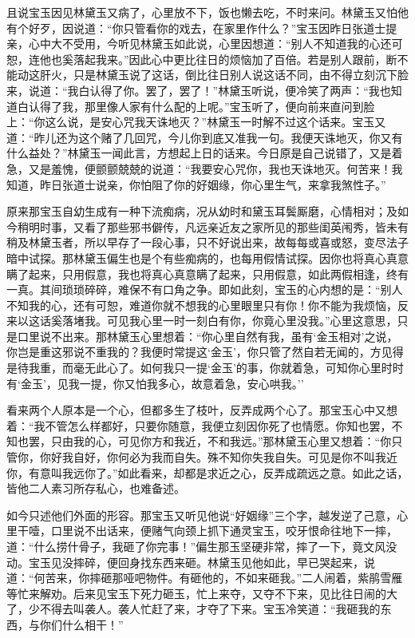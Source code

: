且说宝玉因见林黛玉又病了，心里放不下，饭也懒去吃，不时来问。林黛玉又怕他有个好歹，因说道：``你只管看你的戏去，在家里作什么？''宝玉因昨日张道士提亲，心中大不受用，今听见林黛玉如此说，心里因想道：``别人不知道我的心还可恕，连他也奚落起我来。''因此心中更比往日的烦恼加了百倍。若是别人跟前，断不能动这肝火，只是林黛玉说了这话，倒比往日别人说这话不同，由不得立刻沉下脸来，说道：``我白认得了你。罢了，罢了！''林黛玉听说，便冷笑了两声：``我也知道白认得了我，那里像人家有什么配的上呢。''宝玉听了，便向前来直问到脸上：``你这么说，是安心咒我天诛地灭？''林黛玉一时解不过这个话来。宝玉又道：``昨儿还为这个赌了几回咒，今儿你到底又准我一句。我便天诛地灭，你又有什么益处？''林黛玉一闻此言，方想起上日的话来。今日原是自己说错了，又是着急，又是羞愧，便颤颤兢兢的说道：``我要安心咒你，我也天诛地灭。何苦来！我知道，昨日张道士说亲，你怕阻了你的好姻缘，你心里生气，来拿我煞性子。''

原来那宝玉自幼生成有一种下流痴病，况从幼时和黛玉耳鬓厮磨，心情相对；及如今稍明时事，又看了那些邪书僻传，凡远亲近友之家所见的那些闺英闱秀，皆未有稍及林黛玉者，所以早存了一段心事，只不好说出来，故每每或喜或怒，变尽法子暗中试探。那林黛玉偏生也是个有些痴病的，也每用假情试探。因你也将真心真意瞒了起来，只用假意，我也将真心真意瞒了起来，只用假意，如此两假相逢，终有一真。其间琐琐碎碎，难保不有口角之争。即如此刻，宝玉的心内想的是：``别人不知我的心，还有可恕，难道你就不想我的心里眼里只有你！你不能为我烦恼，反来以这话奚落堵我。可见我心里一时一刻白有你，你竟心里没我。''心里这意思，只是口里说不出来。那林黛玉心里想着：``你心里自然有我，虽有`金玉相对'之说，你岂是重这邪说不重我的？我便时常提这`金玉'，你只管了然自若无闻的，方见得是待我重，而毫无此心了。如何我只一提`金玉'的事，你就着急，可知你心里时时有`金玉'，见我一提，你又怕我多心，故意着急，安心哄我。''

看来两个人原本是一个心，但都多生了枝叶，反弄成两个心了。那宝玉心中又想着：``我不管怎么样都好，只要你随意，我便立刻因你死了也情愿。你知也罢，不知也罢，只由我的心，可见你方和我近，不和我远。''那林黛玉心里又想着：``你只管你，你好我自好，你何必为我而自失。殊不知你失我自失。可见是你不叫我近你，有意叫我远你了。''如此看来，却都是求近之心，反弄成疏远之意。如此之话，皆他二人素习所存私心，也难备述。

如今只述他们外面的形容。那宝玉又听见他说``好姻缘''三个字，越发逆了己意，心里干噎，口里说不出话来，便赌气向颈上抓下通灵宝玉，咬牙恨命往地下一摔，道：``什么捞什骨子，我砸了你完事！''偏生那玉坚硬非常，摔了一下，竟文风没动。宝玉见没摔碎，便回身找东西来砸。林黛玉见他如此，早已哭起来，说道：``何苦来，你摔砸那哑吧物件。有砸他的，不如来砸我。''二人闹着，紫鹃雪雁等忙来解劝。后来见宝玉下死力砸玉，忙上来夺，又夺不下来，见比往日闹的大了，少不得去叫袭人。袭人忙赶了来，才夺了下来。宝玉冷笑道：``我砸我的东西，与你们什么相干！''

